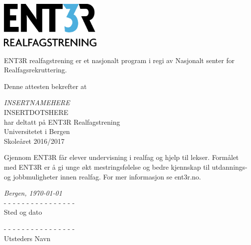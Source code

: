\documentclass[a4paper, 12pt]{article}
\begin{document}
\begin{center}
	\includegraphics[width=0.375\textwidth]{figs/ent3r_farge.jpg} \\
	\vspace{2em}
	\begin{minipage}{25em}
		\begin{center}
			ENT3R realfagstrening er et nasjonalt program i 
			regi av Nasjonalt senter for Realfagsrekruttering.
		\end{center}
		
	\end{minipage}
	
	
	\vspace{5em}
	Denne attesten bekrefter at
	\vspace{2em}
	
	{\huge \itshape INSERTNAMEHERE} \\
	\textcolor{ent3rfarge}{\Huge INSERTDOTSHERE} \\
	\vspace{1em}
	har deltatt på ENT3R Realfagstrening \\
	
	Universitetet i Bergen \\
	Skoleåret 2016/2017
	
	\vspace{5em}
	
	\begin{minipage}{25em}
		Gjennom ENT3R får elever undervisning i
		realfag og hjelp til lekser. Formålet med ENT3R er å
		gi unge økt mestringsfølelse og bedre kjennskap til
		utdannings- og jobbmuligheter innen realfag.
		For mer informasjon se ent3r.no.
	\end{minipage}
	
	\vspace{6em}
\end{center}
\begin{minipage}{12em}
	{\itshape Bergen, \today} \\
	\textcolor{ent3rfarge}{\large - - - - - - - - - - - - - - - - } \\
	Sted og dato
\end{minipage}
\hfill
\begin{minipage}{12em}
	\textcolor{ent3rfarge}{\large - - - - - - - - - - - - - - - - } \\
	Utsteders Navn
\end{minipage}
\\
\end{document}
